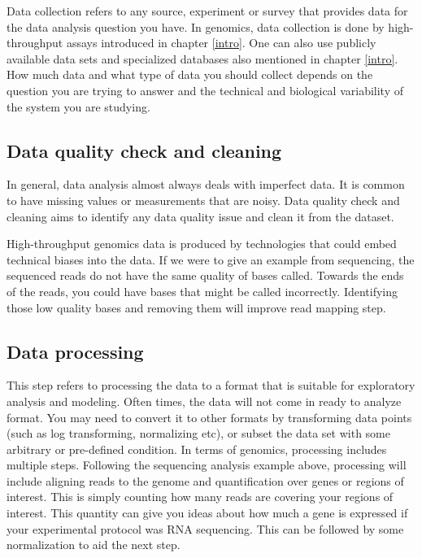 \documentclass[12pt,]{krantz}
\begin{document}
Data collection refers to any source, experiment or survey that provides data for the data analysis question you have. In genomics, data collection is done by high-throughput assays introduced in chapter \ref{intro}. One can also use publicly available data sets and specialized databases also mentioned in chapter \ref{intro}. How much data and what type of data you should collect depends on the question you are trying to answer and the technical and biological variability of the system you are studying.

\hypertarget{data-quality-check-and-cleaning}{%
\subsection{Data quality check and cleaning}\label{data-quality-check-and-cleaning}}

In general, data analysis almost always deals with imperfect data. It is
common to have missing values or measurements that are noisy. Data quality check
and cleaning aims to identify any data quality issue and clean it from the dataset.

High-throughput genomics data is produced by technologies that could embed
technical biases into the data. If we were to give an example from sequencing,
the sequenced reads do not have the same quality of bases called. Towards the
ends of the reads, you could have bases that might be called incorrectly. Identifying those low quality bases and removing them will improve read mapping step.

\hypertarget{data-processing}{%
\subsection{Data processing}\label{data-processing}}

This step refers to processing the data to a format that is suitable for
exploratory analysis and modeling. Often times, the data will not come in ready
to analyze format. You may need to convert it to other formats by transforming
data points (such as log transforming, normalizing etc), or subset the data set
with some arbitrary or pre-defined condition. In terms of genomics, processing
includes multiple steps. Following the sequencing analysis example above,
processing will include aligning reads to the genome and quantification over genes or regions of interest. This is simply counting how many reads are covering your regions of interest. This quantity can give you ideas about how much a gene is expressed if your experimental protocol was RNA sequencing. This can be followed by some normalization to aid the next step.
\end{document}

